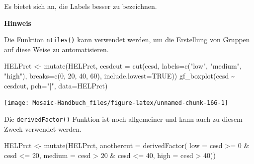 \documentclass[
  ngerman,
]{scrbook}
\newenvironment{Shaded}{\begin{snugshade}}{\end{snugshade}}
\newcommand{\AttributeTok}[1]{\textcolor[rgb]{0.77,0.63,0.00}{#1}}
\newcommand{\ConstantTok}[1]{\textcolor[rgb]{0.00,0.00,0.00}{#1}}
\newcommand{\DecValTok}[1]{\textcolor[rgb]{0.00,0.00,0.81}{#1}}
\newcommand{\FunctionTok}[1]{\textcolor[rgb]{0.00,0.00,0.00}{#1}}
\newcommand{\NormalTok}[1]{#1}
\newcommand{\OtherTok}[1]{\textcolor[rgb]{0.56,0.35,0.01}{#1}}
\newcommand{\SpecialCharTok}[1]{\textcolor[rgb]{0.00,0.00,0.00}{#1}}
\newcommand{\StringTok}[1]{\textcolor[rgb]{0.31,0.60,0.02}{#1}}
\newenvironment{hinweis}[1]
  {
  \begin{itemize}
  \renewcommand{\labelitemi}{
    \raisebox{1.8\height}[0pt][0pt]{
      {\setkeys{Gin}{width=7em,keepaspectratio}
        {\Large \textcolor{dark-fom-green}\faHandORight}}
        }
  }
  \begin{blackbox}
        \bgroup\color{dark-fom-green}
          {\textbf{Hinweis}}
        \egroup
  \item
  }
  {
  \end{blackbox}
  \end{itemize}
  }
\begin{document}
Es bietet sich an, die Labels besser zu bezeichnen.

\begin{hinweis}{hinweis}
Die Funktion \texttt{ntiles()} kann verwendet werden, um die Erstellung von Gruppen auf diese Weise zu automatisieren.

\end{hinweis}

\begin{Shaded}
\begin{Highlighting}[]
\NormalTok{HELPrct }\OtherTok{\textless{}{-}} \FunctionTok{mutate}\NormalTok{(HELPrct, }
                  \AttributeTok{cesdcut =} \FunctionTok{cut}\NormalTok{(cesd, }
                                \AttributeTok{labels=}\FunctionTok{c}\NormalTok{(}\StringTok{"low"}\NormalTok{, }\StringTok{"medium"}\NormalTok{, }\StringTok{"high"}\NormalTok{), }
                                \AttributeTok{breaks=}\FunctionTok{c}\NormalTok{(}\DecValTok{0}\NormalTok{, }\DecValTok{20}\NormalTok{, }\DecValTok{40}\NormalTok{, }\DecValTok{60}\NormalTok{), }
                                \AttributeTok{include.lowest=}\ConstantTok{TRUE}\NormalTok{))}
\FunctionTok{gf\_boxplot}\NormalTok{(cesd }\SpecialCharTok{\textasciitilde{}}\NormalTok{ cesdcut, }\AttributeTok{pch=}\StringTok{"|"}\NormalTok{, }\AttributeTok{data=}\NormalTok{HELPrct)}
\end{Highlighting}
\end{Shaded}

\begin{center}\texttt{[image: Mosaic-Handbuch\_files/figure-latex/unnamed-chunk-166-1]} \end{center}

Die \texttt{derivedFactor()} Funktion ist noch allgemeiner und kann auch zu diesem Zweck verwendet werden.

\begin{Shaded}
\begin{Highlighting}[]
\NormalTok{HELPrct }\OtherTok{\textless{}{-}} \FunctionTok{mutate}\NormalTok{(HELPrct, }
                  \AttributeTok{anothercut =} \FunctionTok{derivedFactor}\NormalTok{(}
                    \AttributeTok{low =}\NormalTok{ cesd }\SpecialCharTok{\textgreater{}=} \DecValTok{0} \SpecialCharTok{\&}\NormalTok{ cesd }\SpecialCharTok{\textless{}=} \DecValTok{20}\NormalTok{, }
                    \AttributeTok{medium =}\NormalTok{ cesd }\SpecialCharTok{\textgreater{}} \DecValTok{20} \SpecialCharTok{\&}\NormalTok{ cesd }\SpecialCharTok{\textless{}=} \DecValTok{40}\NormalTok{, }
                    \AttributeTok{high =}\NormalTok{ cesd }\SpecialCharTok{\textgreater{}} \DecValTok{40}\NormalTok{))}
\end{Highlighting}
\end{Shaded}
\end{document}

